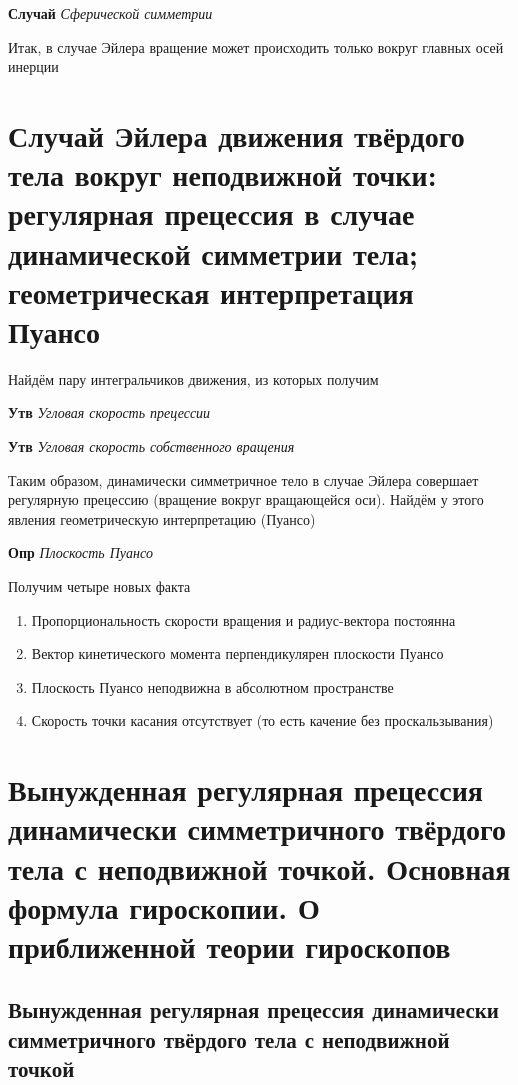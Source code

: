 \documentclass[a4paper, 14pt]{article}
\begin{document}
    \textbf{Случай} \textit{Сферической симметрии}
    
    Итак, в случае Эйлера вращение может происходить только вокруг главных осей инерции
    
    \section{Случай Эйлера движения твёрдого тела вокруг неподвижной точки: регулярная прецессия в случае
    динамической симметрии тела; геометрическая интерпретация Пуансо}
    
    Найдём пару интегральчиков движения, из которых получим
    
    \textbf{Утв} \textit{Угловая скорость прецессии}
    
    \textbf{Утв} \textit{Угловая скорость собственного вращения}
    
    Таким образом, динамически симметричное тело в случае Эйлера совершает регулярную прецессию (вращение вокруг
    вращающейся оси).
    Найдём у этого явления геометрическую интерпретацию (Пуансо)
    
    \textbf{Опр} \textit{Плоскость Пуансо}
    
    Получим четыре новых факта
    
    \begin{enumerate}
        \item Пропорциональность скорости вращения и радиус-вектора постоянна
        \item Вектор кинетического момента перпендикулярен плоскости Пуансо
        \item Плоскость Пуансо неподвижна в абсолютном пространстве
        \item Скорость точки касания отсутствует (то есть качение без проскальзывания)
    \end{enumerate}
    
    \section{Вынужденная регулярная прецессия динамически симметричного твёрдого тела с неподвижной точкой.
    Основная формула гироскопии.
    О приближенной теории гироскопов}
    
    \subsection{Вынужденная регулярная прецессия динамически симметричного твёрдого тела с неподвижной точкой}
    
\end{document}

